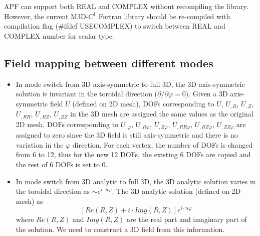\documentclass[11pt]{article}  %
\begin{document}
APF can support both REAL and COMPLEX without recompiling the library. However, the current M3D-$C^1$ Fortran library should be re-compiled with compilation flag (\#ifdef USECOMPLEX) to switch between REAL and COMPLEX number for scalar type. 

\subsection{Field mapping between different modes }
\begin{itemize}
\item In mode switch from 3D axis-symmetric to full 3D, the 3D axis-symmetric solution is invariant in the toroidal direction ($\partial/\partial \varphi =0$).
Given a 3D axis-symmetric field $U$ (defined on 2D mesh),  DOFs corresponding to $U$, $U_{,R}$, $U_{,Z}$, $U_{,RR}$, $U_{,RZ}$, $U_{,ZZ}$ in the 3D mesh are assigned the same values as the original 2D mesh. DOFs corresponding to $ U_{,\varphi}$, $U_{,R\varphi}$, $U_{,Z\varphi}$, $U_{,RR\varphi}$, $U_{,RZ\varphi}$, $U_{,ZZ\varphi}$ are assigned to zero since the 3D field is still axis-symmetric and there is no variation in the $\varphi$ direction. For each vertex, the number of DOFs is changed from 6 to 12, thus for the new 12 DOFs, the existing 6 DOFs are copied and the rest of 6 DOFs is set to 0.

\item In mode switch from 3D analytic to full 3D, the 3D analytic solution varies in the toroidal direction as $\sim e^{i\cdot n\varphi}$. The 3D analytic solution (defined on 2D mesh) as
\begin{equation}
\left[  Re(R,Z)+i\cdot Img(R,Z)  \right] e^{i\cdot n\varphi}
 \end{equation} 
  where $Re(R,Z)$ and $Img(R,Z)$ are the real part and imaginary  part of the solution. We need to construct a 3D field from this information.
\end{itemize}

\end{document}
